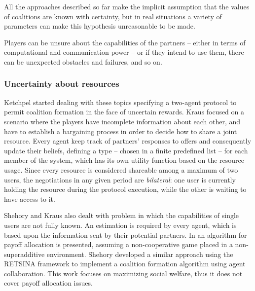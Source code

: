 \documentclass[11pt, twoside, titlepage, a4paper, openright]{report}
\begin{document}
All the approaches described so far make the implicit assumption that the values of coalitions are known with certainty, but in real situations a variety of parameters can make this hypothesis unreasonable to be made.

\noindent Players can be unsure about the capabilities of the partners -- either in terms of computational and communication power -- or if they intend to use them, there can be unexpected obstacles and failures, and so on. 

\subsubsection{Uncertainty about resources}

Ketchpel \cite{Ketchpel94formingcoalitions} started dealing with these topics specifying a two-agent protocol to permit coalition formation in the face of uncertain rewards. Kraus \cite{Kraus1995297} focused on a scenario where the players have incomplete information about each other, and have to establish a bargaining process in order to decide how to share a joint resource. Every agent keep track of partners' responses to offers and consequently update their beliefs, defining a type -- chosen in a finite predefined list -- for each member of the system, which has its own utility function based on the resource usage. Since every resource is considered shareable among a maximum of two users, the negotiations in any given period are \textit{bilateral}: one user is currently holding the resource during the protocol execution, while the other is waiting to have access to it.

Shehory and Kraus \cite{DBLP:journals/ai/ShehoryK98,COIN:COIN092} also dealt with problem in which the capabilities of single users are not fully known. An estimation is required by every agent, which is based upon the information sent by their potential partners. In \cite{COIN:COIN092} an algorithm for payoff allocation is presented, assuming a non-cooperative game placed in a non-superadditive environment.
Shehory \cite{springerlink:10.1007/BFb0026756} developed a similar approach using the RETSINA framework to implement a coalition formation algorithm using agent collaboration. This work focuses on maximizing social welfare, thus it does not cover payoff allocation issues.
\end{document}
